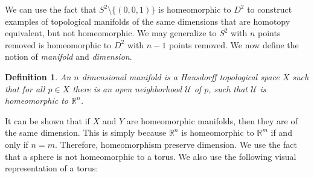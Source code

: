 \documentclass{article}
\theoremstyle{mystyle}
\newtheorem{definition}{Definition}[section]
\begin{document}
We can use the fact that $S^{2}\setminus \{(0,0,1)\}$ is homeomorphic to $D^{2}$ to construct examples of topological manifolds of the same dimensions that are homotopy equivalent, but not homeomorphic. We may generalize to $S^{2}$ with $n$ points removed is homeomorphic to $D^{2}$ with $n-1$ points removed. We now define the notion of \textit{manifold} and \textit{dimension}.
\begin{definition}
An $n$ dimensional manifold is a Hausdorff topological space $X$ such that for all $p\in X$ there is an open neighborhood $\mathcal{U}$ of $p$, such that $\mathcal{U}$ is homeomorphic to $\mathbb{R}^{n}$.
\end{definition}
It can be shown that if $X$ and $Y$ are homeomorphic manifolds, then they are of the same dimension. This is simply because $\mathbb{R}^{n}$ is homeomorphic to $\mathbb{R}^{m}$ if and only if $n=m$. Therefore, homeomorphism preserve dimension. We use the fact that a sphere is not homeomorphic to a torus. We also use the following visual representation of a torus:
\end{document}
